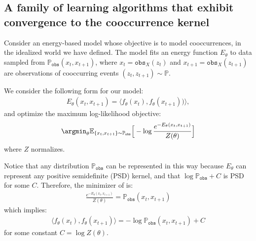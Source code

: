 

\subsection{A family of learning algorithms that exhibit convergence to the cooccurrence kernel}
Consider an energy-based model whose objective is to model cooccurrences, in the idealized world we have defined. The model fits an energy function $E_{\theta}$ to data sampled from $\mathbb{P}_{\texttt{obs}}(x_t,x_{t+1})$, where $x_t = \texttt{obs}_X(z_t)$ and $x_{t+1}=\texttt{obs}_X(z_{t+1})$ are observations of cooccurring events $(z_t, z_{t+1})\sim \mathbb{P}$.

We consider the following form for our model:
\begin{align}
    E_{\theta}(x_t,x_{t+1}) = \langle f_{\theta}(x_t), f_{\theta}(x_{t+1})) \rangle, \label{eqn:coccurrence_model}
\end{align}
and optimize the maximum log-likelihood objective:
\begin{align}
    \argmin_{\theta} \mathbb{E}_{\{x_t, x_{t+1}\} \sim \mathbb{P}_{\texttt{obs}}} \Big[-\log \frac{e^{-E_{\theta}(x_t,x_{t+1})}}{Z(\theta)}\Big] \label{eqn:ML_obj}
\end{align}
where $Z$ normalizes.

Notice that any distribution $\mathbb{P}_{\texttt{obs}}$ can be represented in this way because $E_\theta$ can represent any positive semidefinite (PSD) kernel, and that $\log \mathbb{P}_\texttt{obs} + C$ is PSD for some $C$.  Therefore, the minimizer of  is:
\begin{align}
    \frac{e^{-E_{\theta}(x_t,x_{t+1})}}{Z(\theta)} = \mathbb{P}_{\texttt{obs}}(x_t,x_{t+1})
\end{align}
which implies:
\begin{align}
    \langle f_{\theta}(x_t), f_{\theta}(x_{t+1}) \rangle = -\log \mathbb{P}_{\texttt{obs}}(x_t,x_{t+1}) + C
\end{align}
for some constant $C = \log Z(\theta)$.

